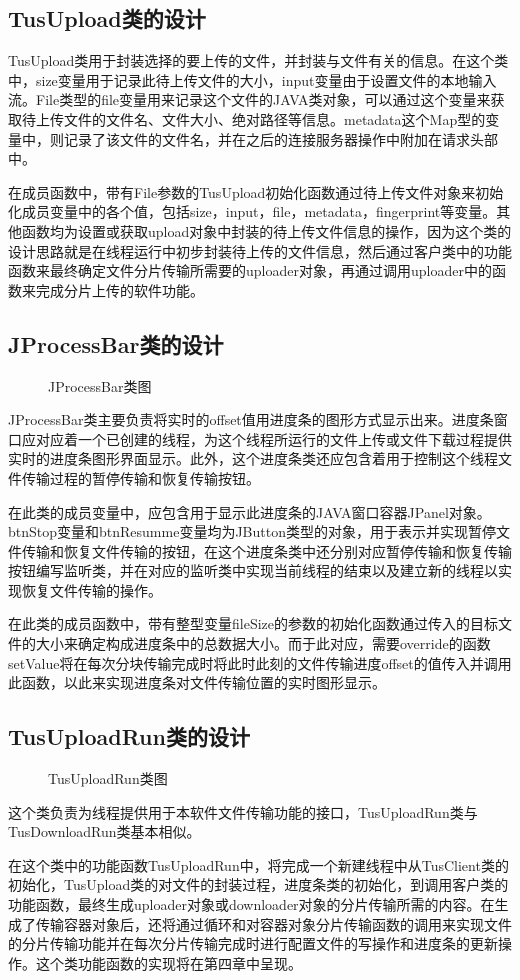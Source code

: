 \documentclass[bachelor]{thesis-uestc}
\begin{document}
\subsection{TusUpload类的设计}
TusUpload类用于封装选择的要上传的文件，并封装与文件有关的信息。在这个类中，size变量用于记录此待上传文件的大小，input变量由于设置文件的本地输入流。File类型的file变量用来记录这个文件的JAVA类对象，可以通过这个变量来获取待上传文件的文件名、文件大小、绝对路径等信息。metadata这个Map型的变量中，则记录了该文件的文件名，并在之后的连接服务器操作中附加在请求头部中。
\par 在成员函数中，带有File参数的TusUpload初始化函数通过待上传文件对象来初始化成员变量中的各个值，包括size，input，file，metadata，fingerprint等变量。其他函数均为设置或获取upload对象中封装的待上传文件信息的操作，因为这个类的设计思路就是在线程运行中初步封装待上传的文件信息，然后通过客户类中的功能函数来最终确定文件分片传输所需要的uploader对象，再通过调用uploader中的函数来完成分片上传的软件功能。

\subsection{JProcessBar类的设计}
\begin{figure}[h]
\caption{JProcessBar类图}
\end{figure}
JProcessBar类主要负责将实时的offset值用进度条的图形方式显示出来。进度条窗口应对应着一个已创建的线程，为这个线程所运行的文件上传或文件下载过程提供实时的进度条图形界面显示。此外，这个进度条类还应包含着用于控制这个线程文件传输过程的暂停传输和恢复传输按钮。
\par 在此类的成员变量中，应包含用于显示此进度条的JAVA窗口容器JPanel对象。btnStop变量和btnResumme变量均为JButton类型的对象，用于表示并实现暂停文件传输和恢复文件传输的按钮，在这个进度条类中还分别对应暂停传输和恢复传输按钮编写监听类，并在对应的监听类中实现当前线程的结束以及建立新的线程以实现恢复文件传输的操作。
\par 在此类的成员函数中，带有整型变量fileSize的参数的初始化函数通过传入的目标文件的大小来确定构成进度条中的总数据大小。而于此对应，需要override的函数setValue将在每次分块传输完成时将此时此刻的文件传输进度offset的值传入并调用此函数，以此来实现进度条对文件传输位置的实时图形显示。

\subsection{TusUploadRun类的设计}
\begin{figure}[h]
\caption{TusUploadRun类图}
\end{figure}
这个类负责为线程提供用于本软件文件传输功能的接口，TusUploadRun类与TusDownloadRun类基本相似。
\par 在这个类中的功能函数TusUploadRun中，将完成一个新建线程中从TusClient类的初始化，TusUpload类的对文件的封装过程，进度条类的初始化，到调用客户类的功能函数，最终生成uploader对象或downloader对象的分片传输所需的内容。在生成了传输容器对象后，还将通过循环和对容器对象分片传输函数的调用来实现文件的分片传输功能并在每次分片传输完成时进行配置文件的写操作和进度条的更新操作。这个类功能函数的实现将在第四章中呈现。
\end{document}
